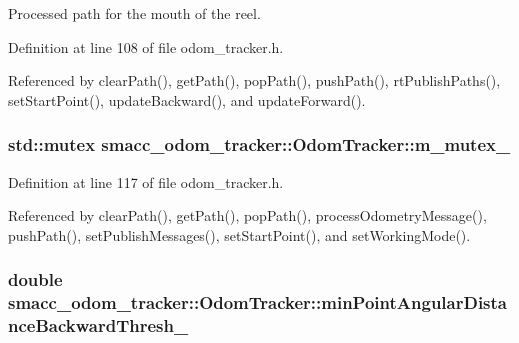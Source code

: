 Processed path for the mouth of the reel. 



Definition at line 108 of file odom\+\_\+tracker.\+h.



Referenced by clear\+Path(), get\+Path(), pop\+Path(), push\+Path(), rt\+Publish\+Paths(), set\+Start\+Point(), update\+Backward(), and update\+Forward().

\subsubsection[{\texorpdfstring{m\+\_\+mutex\+\_\+}{m_mutex_}}]{\setlength{\rightskip}{0pt plus 5cm}std\+::mutex smacc\+\_\+odom\+\_\+tracker\+::\+Odom\+Tracker\+::m\+\_\+mutex\+\_\+\hspace{0.3cm}{\ttfamily [protected]}}\hypertarget{classsmacc__odom__tracker_1_1OdomTracker_ad65e52bfd236e073940808c35f2bed8c}{}\label{classsmacc__odom__tracker_1_1OdomTracker_ad65e52bfd236e073940808c35f2bed8c}


Definition at line 117 of file odom\+\_\+tracker.\+h.



Referenced by clear\+Path(), get\+Path(), pop\+Path(), process\+Odometry\+Message(), push\+Path(), set\+Publish\+Messages(), set\+Start\+Point(), and set\+Working\+Mode().

\subsubsection[{\texorpdfstring{min\+Point\+Angular\+Distance\+Backward\+Thresh\+\_\+}{minPointAngularDistanceBackwardThresh_}}]{\setlength{\rightskip}{0pt plus 5cm}double smacc\+\_\+odom\+\_\+tracker\+::\+Odom\+Tracker\+::min\+Point\+Angular\+Distance\+Backward\+Thresh\+\_\+\hspace{0.3cm}{\ttfamily [protected]}}\hypertarget{classsmacc__odom__tracker_1_1OdomTracker_ac7cac171a63c8981f8233f71c94d0776}{}\label{classsmacc__odom__tracker_1_1OdomTracker_ac7cac171a63c8981f8233f71c94d0776}


